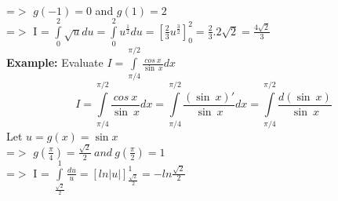 \documentclass{article}
\begin{document}
    \\
    =$>$ $g(-1)=0$ and $g(1)=2$\\
    =$>$ I = $\displaystyle\int\limits_{0}^{2}\sqrt{u}du = \displaystyle\int\limits_{0}^{2} u^\frac{1}{2}du=\left[\displaystyle\frac{2}{3}u^\frac{3}{2}\right]_0^2 = \frac{2}{3}.2\sqrt{2} = \frac{4\sqrt{2}}{3}$\\
\newpage
    \textbf{Example:} Evaluate $I=\displaystyle\int\limits_{\pi/4}^{\pi/2} \frac{cos\ x}{\sin\ x}dx$\\
    \begin{equation*}
        I = \displaystyle\int\limits_{\pi/4}^{\pi/2} \frac{cos\ x}{\sin\ x}dx =\displaystyle\int\limits_{\pi/4}^{\pi/2}\frac{(\sin\ x)'}{\sin\ x}dx=\displaystyle\int\limits_{\pi/4}^{\pi/2}\frac{d(\sin\ x)}{\sin\ x}
    \end{equation*}
    Let $u = g(x) = \sin x$\\
    =$>$ $g(\displaystyle\frac{\pi}{4})=\displaystyle\frac{\sqrt{2}}{2}\ and\ g\displaystyle(\frac{\pi}{2}) = 1$\\
    =$>$ I = $\displaystyle\int\limits_{\frac{\sqrt{2}}{2}}^{1}\displaystyle\frac{du}{u}=\left[ln|u|\right]_{\frac{\sqrt{2}}{2}}^{1}=-ln\displaystyle\frac{\sqrt{2}}{2}$
\end{document}
